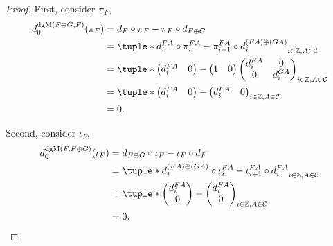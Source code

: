 \begin{proof}
    First, consider \( \pi_F \),
    \begin{align*}
        d_0^{\dgM(F \oplus G, F)} ( \pi_F ) &= d_F \circ \pi_F - \pi_F \circ d_{F \oplus G} \\
        &= \tuple*{ d_i^{F A} \circ \pi_i^{F A} - \pi_{i + 1}^{F A} \circ d_i^{(F A) \oplus (G A)} }_{i \in \Zb, A \in \Cc} \\
        &= \tuple*{
            \begin{pmatrix}
                d_i^{F A} & 0
            \end{pmatrix}
            -
            \begin{pmatrix}
                1 & 0
            \end{pmatrix}
            \begin{pmatrix}
                d_i^{F A} & 0 \\
                0 & d_i^{G A}
            \end{pmatrix}
        }_{i \in \Zb, A \in \Cc} \\
        &= \tuple*{
            \begin{pmatrix}
                d_i^{F A} & 0
            \end{pmatrix}
            -
            \begin{pmatrix}
                d_i^{F A} & 0
            \end{pmatrix}
        }_{i \in \Zb, A \in \Cc} \\
        &= 0.
    \end{align*}

    Second, consider \( \iota_F \),
    \begin{align*}
        d_0^{\dgM(F, F \oplus G)} ( \iota_F ) &= d_{F \oplus G} \circ \iota_F - \iota_F \circ d_F \\
        &= \tuple*{ d_i^{(F A) \oplus (G A)} \circ \iota_i^{F A} - \iota_{i + 1}^{F A} \circ d_i^{F A} }_{i \in \Zb, A \in \Cc} \\
        &= \tuple*{
            \begin{pmatrix}
                d_i^{F A} \\
                0
            \end{pmatrix}
            -
            \begin{pmatrix}
                d_i^{F A} \\
                0
            \end{pmatrix}
        }_{i \in \Zb, A \in \Cc} \\
        &= 0. \qedhere
    \end{align*}
\end{proof}

